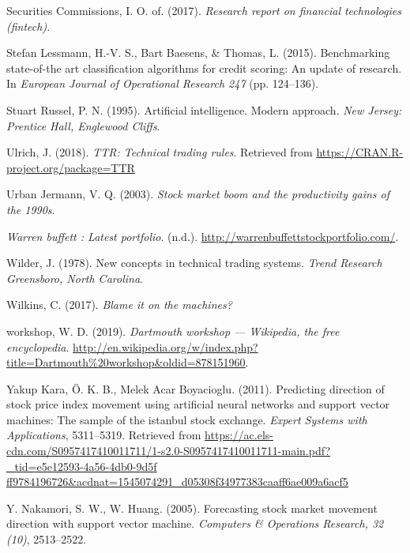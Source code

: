 \documentclass[]{DissertateUSU}
\begin{document}
\leavevmode\hypertarget{ref-IOSCO}{}%
Securities Commissions, I. O. of. (2017). \emph{Research report on
financial technologies (fintech)}.

\leavevmode\hypertarget{ref-creditscoring1}{}%
Stefan Lessmann, H.-V. S., Bart Baesens, \& Thomas, L. (2015).
Benchmarking state-of-the art classification algorithms for credit
scoring: An update of research. In \emph{European Journal of Operational
Research 247} (pp. 124--136).

\leavevmode\hypertarget{ref-aimodern}{}%
Stuart Russel, P. N. (1995). Artificial intelligence. Modern approach.
\emph{New Jersey: Prentice Hall, Englewood Cliffs}.

\leavevmode\hypertarget{ref-TTR}{}%
Ulrich, J. (2018). \emph{TTR: Technical trading rules}. Retrieved from
\url{https://CRAN.R-project.org/package=TTR}

\leavevmode\hypertarget{ref-stockboomJermann}{}%
Urban Jermann, V. Q. (2003). \emph{Stock market boom and the
productivity gains of the 1990s}.

\leavevmode\hypertarget{ref-warrenbuffet}{}%
\emph{Warren buffett : Latest portfolio}. (n.d.).
\url{http://warrenbuffettstockportfolio.com/}.

\leavevmode\hypertarget{ref-ATR}{}%
Wilder, J. (1978). New concepts in technical trading systems.
\emph{Trend Research Greensboro, North Carolina}.

\leavevmode\hypertarget{ref-macro}{}%
Wilkins, C. (2017). \emph{Blame it on the machines?}

\leavevmode\hypertarget{ref-Dartmouth_workshop}{}%
workshop, W. D. (2019). \emph{Dartmouth workshop --- Wikipedia, the free
encyclopedia}.
\url{http://en.wikipedia.org/w/index.php?title=Dartmouth\%20workshop\&oldid=878151960}.

\leavevmode\hypertarget{ref-yakupkara}{}%
Yakup Kara, Ö. K. B., Melek Acar Boyacioglu. (2011). Predicting
direction of stock price index movement using artificial neural networks
and support vector machines: The sample of the istanbul stock exchange.
\emph{Expert Systems with Applications}, 5311--5319. Retrieved from
\href{https://ac.els-cdn.com/S0957417410011711/1-s2.0-S0957417410011711-main.pdf?_tid=e5e12593-4a56-4db0-9d5f\%20ff9784196726\&acdnat=1545074291_d05308f34977383caaff6ae009a6acf5}{https://ac.els-cdn.com/S0957417410011711/1-s2.0-S0957417410011711-main.pdf?\_tid=e5e12593-4a56-4db0-9d5f ff9784196726\&acdnat=1545074291\_d05308f34977383caaff6ae009a6acf5}

\leavevmode\hypertarget{ref-Huang2}{}%
Y. Nakamori, S. W., W. Huang. (2005). Forecasting stock market movement
direction with support vector machine. \emph{Computers \& Operations
Research, 32 (10)}, 2513--2522.
\end{document}
